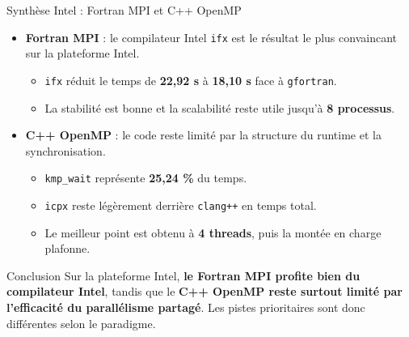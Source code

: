 \begin{frame}{Synthèse Intel : Fortran MPI et C++ OpenMP}
    \begin{itemize}
        \fontsize{8}{9}\selectfont
        \item \textbf{Fortran MPI} : le compilateur Intel \texttt{ifx} est le résultat le plus convaincant sur la plateforme Intel.
        \begin{itemize}
            \fontsize{8}{9}\selectfont
            \item \texttt{ifx} réduit le temps de \textbf{22,92 s} à \textbf{18,10 s} face à \texttt{gfortran}.
            \item La stabilité est bonne et la scalabilité reste utile jusqu'à \textbf{8 processus}.
        \end{itemize}
        \item \textbf{C++ OpenMP} : le code reste limité par la structure du runtime et la synchronisation.
        \begin{itemize}
            \fontsize{8}{9}\selectfont
            \item \texttt{kmp\_wait} représente \textbf{25,24 \%} du temps.
            \item \texttt{icpx} reste légèrement derrière \texttt{clang++} en temps total.
            \item Le meilleur point est obtenu à \textbf{4 threads}, puis la montée en charge plafonne.
        \end{itemize}
    \end{itemize}

    \begin{block}{Conclusion}
        \fontsize{8}{9}\selectfont
        Sur la plateforme Intel, \textbf{le Fortran MPI profite bien du compilateur Intel}, tandis que le \textbf{C++ OpenMP reste surtout limité par l'efficacité du parallélisme partagé}. Les pistes prioritaires sont donc différentes selon le paradigme.
    \end{block}
\end{frame}
